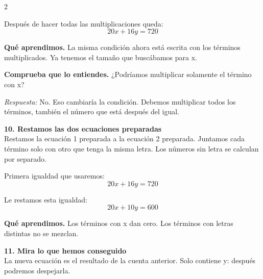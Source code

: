 \documentclass[11pt,a4paper,landscape]{article}
\begin{document}
\begin{multicols*}{2}
\begin{minipage}{\linewidth}
\par\smallskip Después de hacer todas las multiplicaciones queda:
\[20x + 16y = 720\]
\par\smallskip\textbf{Qué aprendimos.} La misma condición ahora está escrita con los términos multiplicados. Ya tenemos el tamaño que buscábamos para x.
\par\smallskip\textbf{Comprueba que lo entiendes.} ¿Podríamos multiplicar solamente el término con x?\par\textit{Respuesta:} No. Eso cambiaría la condición. Debemos multiplicar todos los términos, también el número que está después del igual.
\end{minipage}\par\medskip
\noindent\begin{minipage}{\linewidth}\textbf{10. Restamos las dos ecuaciones preparadas}\\[2pt]Restamos la ecuación 1 preparada a la ecuación 2 preparada. Juntamos cada término solo con otro que tenga la misma letra. Los números sin letra se calculan por separado.
\par{}\par\smallskip
\par\smallskip Primera igualdad que usaremos:
\[20x + 16y = 720\]
\par\smallskip Le restamos esta igualdad:
\[20x + 10y = 600\]
\par\smallskip\textbf{Qué aprendimos.} Los términos con x dan cero. Los términos con letras distintas no se mezclan.
\end{minipage}\par\medskip
\noindent\begin{minipage}{\linewidth}\textbf{11. Mira lo que hemos conseguido}\\[2pt]La nueva ecuación es el resultado de la cuenta anterior. Solo contiene y: después podremos despejarla.

\end{minipage}
\end{multicols*}
\end{document}

